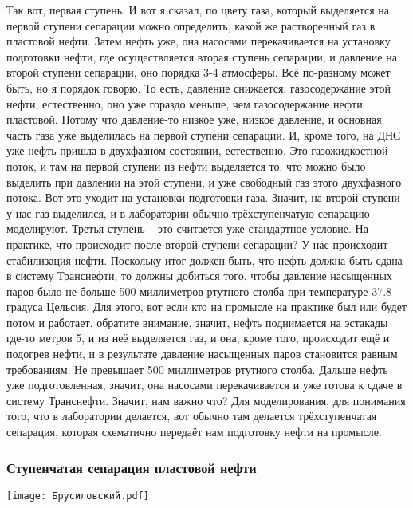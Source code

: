 \documentclass[main.tex]{subfiles}
\begin{document}
Так вот, первая ступень.
И вот я сказал, по цвету газа, который выделяется на первой ступени сепарации можно определить, какой же растворенный газ в пластовой нефти.
Затем нефть уже, она насосами перекачивается на установку подготовки нефти, где осуществляется вторая ступень сепарации, и давление на второй ступени сепарации, оно порядка 3-4 атмосферы.
Всё по-разному может быть, но я порядок говорю.
То есть, давление снижается, газосодержание этой нефти, естественно, оно уже гораздо меньше, чем газосодержание нефти пластовой.
Потому что давление-то низкое уже, низкое давление, и основная часть газа уже выделилась на первой ступени сепарации.
И, кроме того, на ДНС уже нефть пришла в двухфазном состоянии, естественно.
Это газожидкостной поток, и там на первой ступени из нефти выделяется то, что можно было выделить при давлении на этой ступени, и уже свободный газ этого двухфазного потока.
Вот это уходит на установки подготовки газа.
Значит, на второй ступени у нас газ выделился, и в лаборатории обычно трёхступенчатую сепарацию моделируют.
Третья ступень -- это считается уже стандартное условие.
На практике, что происходит после второй ступени сепарации?
У нас происходит стабилизация нефти.
Поскольку итог должен быть, что нефть должна быть сдана в систему Транснефти, то должны добиться того, чтобы давление насыщенных паров было не больше 500 миллиметров ртутного столба при температуре 37.8 градуса Цельсия.
Для этого, вот если кто на промысле на практике был или будет потом и работает, обратите внимание, значит, нефть поднимается на эстакады где-то метров 5, и из неё выделяется газ, и она, кроме того, происходит ещё и подогрев нефти, и в результате давление насыщенных паров становится равным требованиям.
Не превышает 500 миллиметров ртутного столба.
Дальше нефть уже подготовленная, значит, она насосами перекачивается и уже готова к сдаче в систему Транснефти.
Значит, нам важно что?
Для моделирования, для понимания того, что в лаборатории делается, вот обычно там делается трёхступенчатая сепарация, которая схематично передаёт нам подготовку нефти на промысле.

\subsubsection{Ступенчатая сепарация пластовой нефти}

\begin{center}
\texttt{[image: Брусиловский.pdf]}
\end{center}
\end{document}
